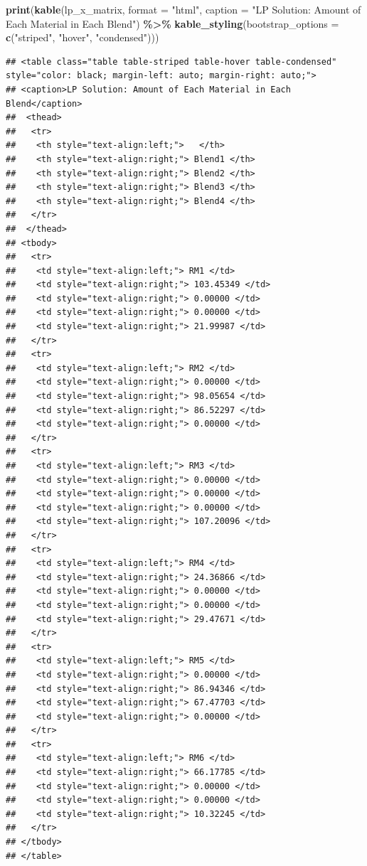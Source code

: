 \documentclass[
]{article}
\newenvironment{Shaded}{\begin{snugshade}}{\end{snugshade}}
\newcommand{\AttributeTok}[1]{\textcolor[rgb]{0.13,0.29,0.53}{#1}}
\newcommand{\FunctionTok}[1]{\textcolor[rgb]{0.13,0.29,0.53}{\textbf{#1}}}
\newcommand{\NormalTok}[1]{#1}
\newcommand{\SpecialCharTok}[1]{\textcolor[rgb]{0.81,0.36,0.00}{\textbf{#1}}}
\newcommand{\StringTok}[1]{\textcolor[rgb]{0.31,0.60,0.02}{#1}}
\begin{document}
\begin{Shaded}
\begin{Highlighting}[]
\FunctionTok{print}\NormalTok{(}\FunctionTok{kable}\NormalTok{(lp\_x\_matrix, }\AttributeTok{format =} \StringTok{"html"}\NormalTok{, }
            \AttributeTok{caption =} \StringTok{"LP Solution: Amount of Each Material in Each Blend"}\NormalTok{) }\SpecialCharTok{\%\textgreater{}\%}
      \FunctionTok{kable\_styling}\NormalTok{(}\AttributeTok{bootstrap\_options =} \FunctionTok{c}\NormalTok{(}\StringTok{"striped"}\NormalTok{, }\StringTok{"hover"}\NormalTok{, }\StringTok{"condensed"}\NormalTok{)))}
\end{Highlighting}
\end{Shaded}

\begin{verbatim}
## <table class="table table-striped table-hover table-condensed" style="color: black; margin-left: auto; margin-right: auto;">
## <caption>LP Solution: Amount of Each Material in Each Blend</caption>
##  <thead>
##   <tr>
##    <th style="text-align:left;">   </th>
##    <th style="text-align:right;"> Blend1 </th>
##    <th style="text-align:right;"> Blend2 </th>
##    <th style="text-align:right;"> Blend3 </th>
##    <th style="text-align:right;"> Blend4 </th>
##   </tr>
##  </thead>
## <tbody>
##   <tr>
##    <td style="text-align:left;"> RM1 </td>
##    <td style="text-align:right;"> 103.45349 </td>
##    <td style="text-align:right;"> 0.00000 </td>
##    <td style="text-align:right;"> 0.00000 </td>
##    <td style="text-align:right;"> 21.99987 </td>
##   </tr>
##   <tr>
##    <td style="text-align:left;"> RM2 </td>
##    <td style="text-align:right;"> 0.00000 </td>
##    <td style="text-align:right;"> 98.05654 </td>
##    <td style="text-align:right;"> 86.52297 </td>
##    <td style="text-align:right;"> 0.00000 </td>
##   </tr>
##   <tr>
##    <td style="text-align:left;"> RM3 </td>
##    <td style="text-align:right;"> 0.00000 </td>
##    <td style="text-align:right;"> 0.00000 </td>
##    <td style="text-align:right;"> 0.00000 </td>
##    <td style="text-align:right;"> 107.20096 </td>
##   </tr>
##   <tr>
##    <td style="text-align:left;"> RM4 </td>
##    <td style="text-align:right;"> 24.36866 </td>
##    <td style="text-align:right;"> 0.00000 </td>
##    <td style="text-align:right;"> 0.00000 </td>
##    <td style="text-align:right;"> 29.47671 </td>
##   </tr>
##   <tr>
##    <td style="text-align:left;"> RM5 </td>
##    <td style="text-align:right;"> 0.00000 </td>
##    <td style="text-align:right;"> 86.94346 </td>
##    <td style="text-align:right;"> 67.47703 </td>
##    <td style="text-align:right;"> 0.00000 </td>
##   </tr>
##   <tr>
##    <td style="text-align:left;"> RM6 </td>
##    <td style="text-align:right;"> 66.17785 </td>
##    <td style="text-align:right;"> 0.00000 </td>
##    <td style="text-align:right;"> 0.00000 </td>
##    <td style="text-align:right;"> 10.32245 </td>
##   </tr>
## </tbody>
## </table>
\end{verbatim}
\end{document}
